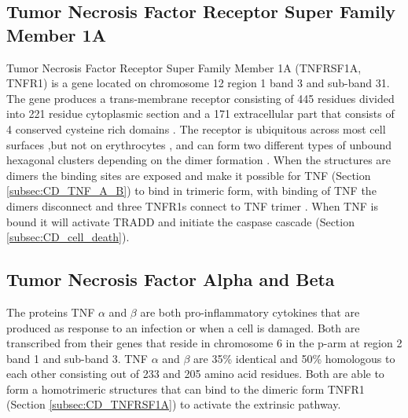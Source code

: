 \subsection{Tumor Necrosis Factor Receptor Super Family Member 1A}
Tumor Necrosis Factor Receptor Super Family Member 1A (TNFRSF1A, TNFR1) is a gene located on chromosome 12 region 1 band 3 and sub-band 31. The gene produces a trans-membrane receptor consisting of 445 residues divided into 221 residue cytoplasmic section and a 171 extracellular part that consists of 4 conserved cysteine rich domains \cite{}.
The receptor is ubiquitous across most cell surfaces ,but not on erythrocytes \cite{}, and can form two different types of unbound hexagonal clusters depending on the dimer formation \cite{}. 
When the structures are dimers the binding sites are exposed and make it possible for TNF (Section \ref{subsec:CD_TNF_A_B}) to bind in trimeric form, with binding of TNF the dimers disconnect and three TNFR1s connect to TNF trimer \cite{}.
When TNF is bound it will activate TRADD \cite{} and initiate the caspase cascade \cite{} (Section \ref{subsec:CD_cell_death}).
\label{subsec:CD_TNFRSF1A}

\subsection{Tumor Necrosis Factor Alpha and Beta}
The proteins TNF $\alpha$ and $\beta$ are both pro-inflammatory cytokines that are produced as response to an infection or when a cell is damaged. Both are transcribed from their genes that reside in chromosome 6 in the p-arm at region 2 band 1 and sub-band 3. TNF $\alpha$ and $\beta$ are 35\% identical and 50\% homologous to each other consisting out of 233 and 205 amino acid residues. Both are able to form a homotrimeric structures that can bind to the dimeric form TNFR1 (Section \ref{subsec:CD_TNFRSF1A}) to activate the extrinsic pathway\cite{}. 
\label{subsec:CD_TNF_A_B}